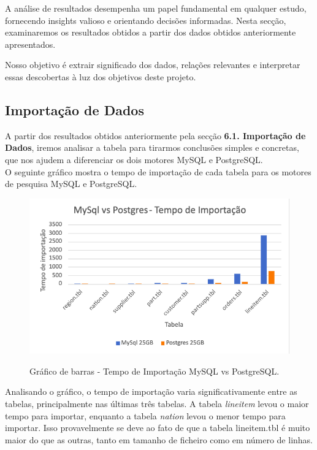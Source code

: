 \documentclass{article}
\begin{document}
\texttt{}\par A análise de resultados desempenha um papel fundamental em qualquer estudo, fornecendo insights valioso e orientando decisões informadas. Nesta secção, examinaremos os resultados obtidos a partir dos dados obtidos anteriormente apresentados. 

\texttt{}\par Nosso objetivo é extrair significado dos dados, relações relevantes e interpretar essas descobertas à luz dos objetivos deste projeto.\\
\subsection{Importação de Dados}
\texttt{}\par A partir dos resultados obtidos anteriormente pela secção \textbf{6.1. Importação de Dados}, iremos analisar a tabela para tirarmos conclusões simples e concretas, que nos ajudem a diferenciar os dois motores MySQL e PostgreSQL.\\
O seguinte gráfico mostra o tempo de importação de cada tabela para os motores de pesquisa MySQL e PostgreSQL. 


\begin{figure}[H]
  \centering
  \includegraphics[width=\textwidth]{Graphs/ImportTime.png}\\
  \caption{Gráfico de barras - Tempo de Importação MySQL vs PostgreSQL.}
  \label{fig:row_import_time}
\end{figure}
Analisando o gráfico, o tempo de importação varia significativamente entre as tabelas, principalmente nas últimas três tabelas. A tabela \textit{lineitem} levou o maior tempo para importar, enquanto a tabela \textit{nation} levou o menor tempo para importar.
Isso provavelmente se deve ao fato de que a tabela lineitem.tbl é muito maior do que as outras, tanto em tamanho de ficheiro como em número de linhas.\\
\end{document}
